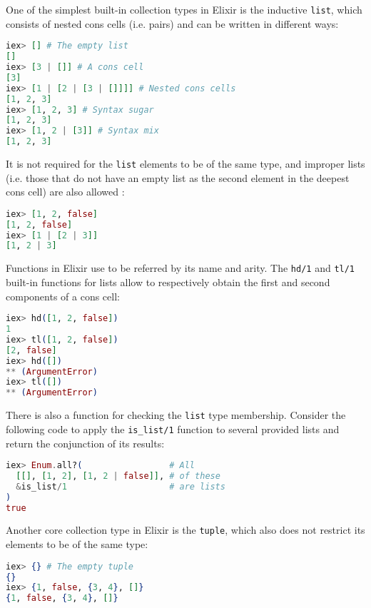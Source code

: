 One of the simplest built-in collection types in Elixir is the inductive 
\verb|list|, which consists of nested cons cells (i.e. pairs) and can be
written in different ways:

\begin{lstlisting}[language=elixir,numbers=none,frame=none]
iex> [] # The empty list 
[] 
iex> [3 | []] # A cons cell
[3]
iex> [1 | [2 | [3 | []]]] # Nested cons cells
[1, 2, 3]
iex> [1, 2, 3] # Syntax sugar
[1, 2, 3]
iex> [1, 2 | [3]] # Syntax mix
[1, 2, 3]
\end{lstlisting}

It is not required for the \verb|list| elements to be of the same type, and
improper lists (i.e. those that do not have an empty list as the second element
in the deepest cons cell) are also allowed \citep{ElixirDocs}:

\begin{lstlisting}[language=elixir,numbers=none,frame=none]
iex> [1, 2, false]
[1, 2, false]
iex> [1 | [2 | 3]] 
[1, 2 | 3]
\end{lstlisting}

Functions in Elixir use to be referred by its name and arity. The \verb|hd/1|
and \verb|tl/1| built-in functions for lists allow to respectively obtain the
first and second components of a cons cell:

\begin{lstlisting}[language=elixir,numbers=none,frame=none]
iex> hd([1, 2, false])
1
iex> tl([1, 2, false])
[2, false]
iex> hd([])
** (ArgumentError)
iex> tl([])
** (ArgumentError)
\end{lstlisting}

There is also a function for checking the \verb|list| type membership. Consider
the following code to apply the \verb|is_list/1| function to several provided 
lists and return the conjunction of its results:

\begin{lstlisting}[language=elixir,numbers=none,frame=none]
iex> Enum.all?(                 # All
  [[], [1, 2], [1, 2 | false]], # of these
  &is_list/1                    # are lists
)
true
\end{lstlisting}

Another core collection type in Elixir is the \verb|tuple|, which also does not
restrict its elements to be of the same type:

\begin{lstlisting}[language=elixir,numbers=none,frame=none]
iex> {} # The empty tuple
{}
iex> {1, false, {3, 4}, []}
{1, false, {3, 4}, []}
\end{lstlisting}

